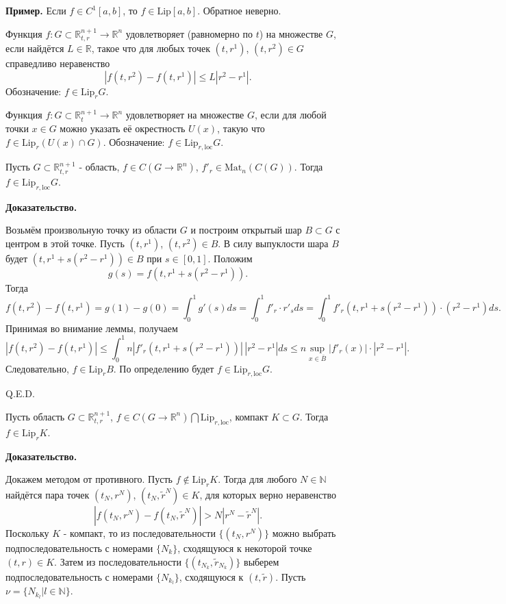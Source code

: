 \textbf{Пример.} Если $f \in C^1[a, b]$, то $f \in \text{Lip}[a, b]$. Обратное неверно.

 Функция $f: G \subset \mathbb{R}_{t, r}^{n+1} \rightarrow \mathbb{R}^n$ удовлетворяет  (равномерно по $t$) на множестве $G$, если найдётся $L \in \mathbb{R}$, такое что для любых точек $(t, r^1)$, $(t, r^2) \in G$ справедливо неравенство
$$|f(t, r^2) - f(t, r^1)| \leq L |r^2 - r^1|.$$
Обозначение: $f \in \text{Lip}_r G$.

 Функция $f: G \subset \mathbb{R}_t^{n+1} \rightarrow \mathbb{R}^n$ удовлетворяет  на множестве $G$, если для любой точки $x \in G$ можно указать её окрестность $U(x)$, такую что $f \in \text{Lip}_r (U(x) \cap G)$. Обозначение: $f \in \text{Lip}_{r, \text{loc}} G$. 




Пусть $G \subset \mathbb{R}_{t,r}^{n+1}$ - область, $f \in C(G \rightarrow \mathbb{R}^n)$, $f'_r \in \text{Mat}_n (C(G))$. Тогда $f \in \text{Lip}_{r, \text{loc}} G$.

\textbf{Доказательство.} 

Возьмём произвольную точку из области $G$ и построим открытый шар $B \subset G$ с центром в этой точке. 
Пусть $(t, r^1)$, $(t, r^2) \in B$. В силу выпуклости шара $B$ будет $(t, r^1 + s(r^2 - r^1)) \in B$ при $s \in [0, 1]$. Положим
$$g(s) = f(t, r^1 + s(r^2 - r^1)).$$
Тогда
$$f(t, r^2) - f(t, r^1) = g(1) - g(0) = \int_0^1 g'(s) ds = \int_0^1 f'_r \cdot r'_s ds = \int_0^1 f'_r (t, r^1 + s(r^2 - r^1)) \cdot (r^2 - r^1) ds.$$
Принимая во внимание леммы, получаем 
$$|f(t, r^2) - f(t, r^1)| \leq \int_0^1 n |f'_r(t, r^1 + s(r^2 - r^1))| \, |r^2 - r^1| ds \leq n \sup_{x \in \bar{B}} |f'_r(x)| \cdot |r^2 - r^1|.$$
Следовательно, $f \in \text{Lip}_r B$. По определению будет $f \in \text{Lip}_{r, \text{loc}} G$.

\hfill Q.E.D.


Пусть область $G \subset \mathbb{R}_{t,r}^{n+1}$, $f \in C(G \rightarrow \mathbb{R}^n) \bigcap \text{Lip}_{r, \text{loc}}$, компакт $K \subset G$. Тогда $f \in \text{Lip}_r K$.

\textbf{Доказательство.} 

Докажем методом от противного. Пусть $f \notin \text{Lip}_r K$. Тогда для любого $N \in \mathbb{N}$ найдётся пара точек $(t_N, r^N)$, $(t_N, \tilde{r}^N) \in K$, для которых верно неравенство
$$|f(t_N, r^N) - f(t_N, \tilde{r}^N)| > N |r^N - \tilde{r}^N|. $$
Поскольку $K$ - компакт, то из последовательности $\{(t_N, r^N)\}$ можно выбрать подпоследовательность с номерами $\{N_k\}$, сходящуюся к некоторой точке $(t, r) \in K$. Затем из последовательности $\{(t_{N_k}, \tilde{r}_{N_k})\}$ выберем подпоследовательность с номерами $\{N_{k_l}\}$, сходящуюся к $(t, \tilde{r})$. Пусть $\nu = \{N_{k_l} | l \in \mathbb{N}\}$.

